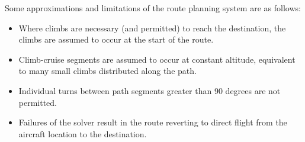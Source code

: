 Some approximations and limitations of the route planning system are as follows:
\begin{itemize}
\item Where climbs are necessary (and permitted) to reach the destination,
the climbs are assumed to occur at the start of the route.
\item Climb-cruise segments are assumed to occur at constant altitude,
equivalent to many small climbs distributed along the path.
\item Individual turns between path segments greater than 90 degrees
  are not permitted.
\item Failures of the solver result in the route reverting to direct flight
from the aircraft location to the destination.
\end{itemize}

